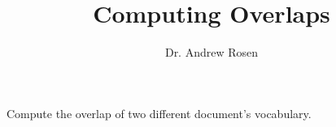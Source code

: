 \documentclass[10pt,letterpaper]{article}
\author{Dr. Andrew Rosen}
\title{Computing Overlaps}
\begin{document}
	
	
	Compute the overlap of two different document's vocabulary.
	
\end{document}
